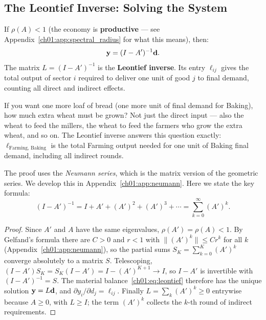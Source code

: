 \documentclass[../structural_economics_book.tex]{subfiles}
\begin{document}
\subsection{The Leontief Inverse: Solving the System}

\begin{theorem}\label{ch01:thm:leontief}
If $\rho(A) < 1$ (the economy is \textbf{productive} --- see Appendix~\ref{ch01:app:spectral_radius} for what this means), then:
\begin{equation}\label{ch01:eq:leontief_inverse}
\mathbf{y} = (I - A')^{-1}\mathbf{d}.
\end{equation}
The matrix $L = (I - A')^{-1}$ is the \textbf{Leontief inverse}. Its entry $\ell_{ij}$ gives the total output of sector $i$ required to deliver one unit of good $j$ to final demand, counting all direct and indirect effects.
\end{theorem}

\begin{intuition}
If you want one more loaf of bread (one more unit of final demand for Baking), how much extra wheat must be grown? Not just the direct input --- also the wheat to feed the millers, the wheat to feed the farmers who grow the extra wheat, and so on. The Leontief inverse answers this question exactly: $\ell_{\text{Farming, Baking}}$ is the total Farming output needed for one unit of Baking final demand, including all indirect rounds.
\end{intuition}

The proof uses the \textit{Neumann series}, which is the matrix version of the geometric series. We develop this in Appendix~\ref{ch01:app:neumann}. Here we state the key formula:
\begin{equation}\label{ch01:eq:neumann}
(I - A')^{-1} = I + A' + (A')^2 + (A')^3 + \cdots = \sum_{k=0}^{\infty} (A')^k.
\end{equation}

\begin{proof}
Since $A'$ and $A$ have the same eigenvalues, $\rho(A') = \rho(A) < 1$. By Gelfand's formula \citep[\S5.6]{horn2012matrix} there are $C > 0$ and $r < 1$ with $\|(A')^k\| \le C r^k$ for all $k$ (Appendix~\ref{ch01:app:neumann}), so the partial sums $S_K = \sum_{k=0}^K (A')^k$ converge absolutely to a matrix $S$. Telescoping, $(I - A')S_K = S_K(I - A') = I - (A')^{K+1} \to I$, so $I - A'$ is invertible with $(I - A')^{-1} = S$. The material balance~\eqref{ch01:eq:leontief} therefore has the unique solution $\mathbf{y} = L\mathbf{d}$, and $\partial y_i/\partial d_j = \ell_{ij}$. Finally $L = \sum_k (A')^k \ge 0$ entrywise because $A \ge 0$, with $L \ge I$; the term $(A')^k$ collects the $k$-th round of indirect requirements.
\end{proof}
\end{document}
